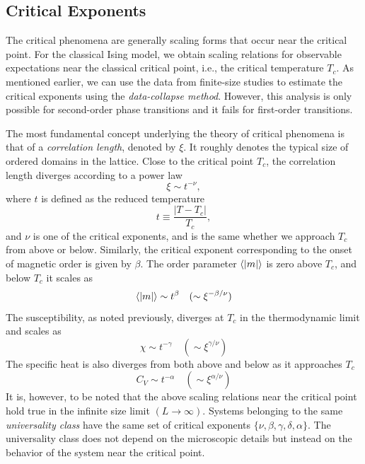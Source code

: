 \documentclass[../thesis_main.tex]{subfiles}
\begin{document}
\subsection{Critical Exponents}
The critical phenomena are generally scaling forms that occur near the critical point. For the classical Ising model, we obtain scaling relations for observable expectations near the classical critical point, i.e., the critical temperature $T_c$. As mentioned earlier, we can use the data from finite-size studies to estimate the critical exponents using the \textit{data-collapse method}. However, this analysis is only possible for second-order phase transitions and it fails for first-order transitions.

The most fundamental concept underlying the theory of critical phenomena is that of a \textit{correlation length}, denoted by $\xi$. It roughly denotes the typical size of ordered domains in the lattice. Close to the critical point $T_c$, the correlation length diverges according to a power law
\begin{equation}
    \xi \sim t^{-\nu},
\end{equation}
where $t$ is defined as the reduced temperature 
\begin{equation}
    t \equiv \frac{|T-T_c|}{T_c},
\end{equation}
and $\nu$ is one of the critical exponents, and is the same whether we approach $T_c$ from above or below. Similarly, the critical exponent corresponding to the onset of magnetic order is given by $\beta$. The order parameter $\expval{|m|}$ is zero above $T_c$, and below $T_c$ it scales as
\begin{equation}
    \expval{|m|} \sim t^\beta \quad (\sim \xi^{-\beta/\nu})
\end{equation}
The susceptibility, as noted previously, diverges at $T_c$ in the thermodynamic limit and scales as 
\begin{equation}
    \chi \sim t^{-\gamma} \quad (\sim \xi^{\gamma/\nu})
\end{equation} 
The specific heat is also diverges from both above and below as it approaches $T_c$ 
\begin{equation}
    C_V \sim t^{-\alpha} \quad (\sim \xi^{\alpha/\nu})
\end{equation}
It is, however, to be noted that the above scaling relations near the critical point hold true in the infinite size limit $(L \to \infty)$. Systems belonging to the same \textit{universality class} have the same set of critical exponents $\{ \nu, \beta, \gamma, \delta, \alpha \}$. The universality class does not depend on the microscopic details but instead on the behavior of the system near the critical point.
\end{document}
